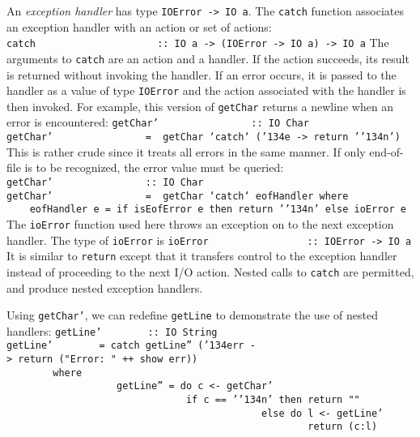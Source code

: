 An {\em exception handler} has type \mbox{\tt IOError\ ->\ IO\ a}.
The \mbox{\tt catch} function associates an exception handler with an action or
set of actions:
\bprog
\mbox{\tt catch\ \ \ \ \ \ \ \ \ \ \ \ \ \ \ \ \ \ \ \ \ ::\ IO\ a\ ->\ (IOError\ ->\ IO\ a)\ ->\ IO\ a}
\eprog
The arguments to \mbox{\tt catch} are an action and a handler.  If the action
succeeds, its result is returned without invoking the handler.  If an
error occurs, it is passed to the handler as a value of type
\mbox{\tt IOError} and the action associated with the handler is then invoked.
For example, this version of \mbox{\tt getChar} returns a newline when an error
is encountered:
\bprog
\mbox{\tt getChar'\ \ \ \ \ \ \ \ \ \ \ \ \ \ \ \ ::\ IO\ Char}\\
\mbox{\tt getChar'\ \ \ \ \ \ \ \ \ \ \ \ \ \ \ \ =\ \ getChar\ `catch`\ ({\char'134}e\ ->\ return\ '{\char'134}n')}
\eprog
This is rather crude since it treats all errors in the same manner.  If
only end-of-file is to be recognized, the error value must be queried:
\bprog
\mbox{\tt getChar'\ \ \ \ \ \ \ \ \ \ \ \ \ \ \ \ ::\ IO\ Char}\\
\mbox{\tt getChar'\ \ \ \ \ \ \ \ \ \ \ \ \ \ \ \ =\ \ getChar\ `catch`\ eofHandler\ where}\\
\mbox{\tt \ \ \ \ eofHandler\ e\ =\ if\ isEofError\ e\ then\ return\ '{\char'134}n'\ else\ ioError\ e}
\eprog
The \mbox{\tt ioError} function used here throws an exception on to the next
exception handler.  The type of \mbox{\tt ioError} is
\bprog
\mbox{\tt ioError\ \ \ \ \ \ \ \ \ \ \ \ \ \ \ \ \ ::\ IOError\ ->\ IO\ a}
\eprog
It is similar to
\mbox{\tt return} except that it transfers control to the exception handler
instead of proceeding to the next 
I/O action.  Nested calls to \mbox{\tt catch} are
permitted, and produce nested exception handlers.

Using \mbox{\tt getChar'}, we can redefine \mbox{\tt getLine} to demonstrate the use of
nested handlers:
\bprog
\mbox{\tt getLine'\ \ \ \ \ \ \ \ ::\ IO\ String}\\
\mbox{\tt getLine'\ \ \ \ \ \ \ \ =\ catch\ getLine''\ ({\char'134}err\ ->\ return\ ("Error:\ "\ ++\ show\ err))}\\
\mbox{\tt \ \ \ \ \ \ \ \ where}\\
\mbox{\tt \ \ \ \ \ \ \ \ \ \ \ \ \ \ \ \ \ \ \ getLine''\ =\ do\ c\ <-\ getChar'}\\
\mbox{\tt \ \ \ \ \ \ \ \ \ \ \ \ \ \ \ \ \ \ \ \ \ \ \ \ \ \ \ \ \ \ \ if\ c\ ==\ '{\char'134}n'\ then\ return\ ""}\\
\mbox{\tt \ \ \ \ \ \ \ \ \ \ \ \ \ \ \ \ \ \ \ \ \ \ \ \ \ \ \ \ \ \ \ \ \ \ \ \ \ \ \ \ \ \ \ \ else\ do\ l\ <-\ getLine'}\\
\mbox{\tt \ \ \ \ \ \ \ \ \ \ \ \ \ \ \ \ \ \ \ \ \ \ \ \ \ \ \ \ \ \ \ \ \ \ \ \ \ \ \ \ \ \ \ \ \ \ \ \ \ \ \ \ return\ (c:l)}
\eprog

